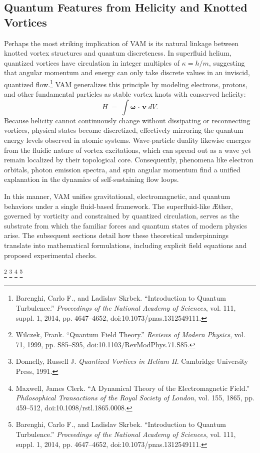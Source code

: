 \documentclass[aps,preprint,superscriptaddress]{revtex4-2}
\begin{document}
    \subsection*{Quantum Features from Helicity and Knotted Vortices}

    Perhaps the most striking implication of VAM is its natural linkage between knotted vortex structures and quantum discreteness. In superfluid helium, quantized vortices have circulation in integer multiples of \(\kappa = h / m\), suggesting that angular momentum and energy can only take discrete values in an inviscid, quantized flow.\footnote{Barenghi, Carlo F., and Ladislav Skrbek. “Introduction to Quantum Turbulence.” \textit{Proceedings of the National Academy of Sciences}, vol. 111, suppl. 1, 2014, pp. 4647–4652, doi:10.1073/pnas.1312549111.} VAM generalizes this principle by modeling electrons, protons, and other fundamental particles as stable vortex knots with conserved helicity:
    \[
        H \;=\; \int \boldsymbol{\omega} \,\cdot\, \mathbf{v}\; dV.
    \]
    Because helicity cannot continuously change without dissipating or reconnecting vortices, physical states become discretized, effectively mirroring the quantum energy levels observed in atomic systems. Wave-particle duality likewise emerges from the fluidic nature of vortex excitations, which can spread out as a wave yet remain localized by their topological core. Consequently, phenomena like electron orbitals, photon emission spectra, and spin angular momentum find a unified explanation in the dynamics of self-sustaining flow loops.

    In this manner, VAM unifies gravitational, electromagnetic, and quantum behaviors under a single fluid-based framework. The superfluid-like Æther, governed by vorticity and constrained by quantized circulation, serves as the substrate from which the familiar forces and quantum states of modern physics arise. The subsequent sections detail how these theoretical underpinnings translate into mathematical formulations, including explicit field equations and proposed experimental checks.

    \footnote{Wilczek, Frank. “Quantum Field Theory.” \textit{Reviews of Modern Physics}, vol. 71, 1999, pp. S85–S95, doi:10.1103/RevModPhys.71.S85.}
    \footnote{Donnelly, Russell J. \textit{Quantized Vortices in Helium II}. Cambridge University Press, 1991.}
    \footnote{Maxwell, James Clerk. “A Dynamical Theory of the Electromagnetic Field.” \textit{Philosophical Transactions of the Royal Society of London}, vol. 155, 1865, pp. 459–512, doi:10.1098/rstl.1865.0008.}
    \footnote{Barenghi, Carlo F., and Ladislav Skrbek. “Introduction to Quantum Turbulence.” \textit{Proceedings of the National Academy of Sciences}, vol. 111, suppl. 1, 2014, pp. 4647–4652, doi:10.1073/pnas.1312549111.}
\end{document}
